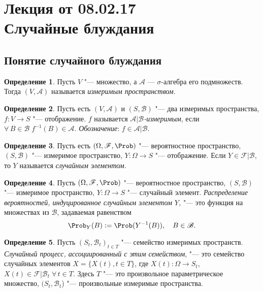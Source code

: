 \documentclass[a4paper]{article}
\theoremstyle{plain}
\theoremstyle{definition}
\newtheorem{defn}{Определение}[section]
\theoremstyle{remark}
\theoremstyle{nonumberplain}
\theoremstyle{nonumberplain}
\begin{document}
\tableofcontents

\section[Лекция от 08.02.17. Случайные блуждания]{Лекция от 08.02.17\\ {\large Случайные блуждания}}

\subsection{Понятие случайного блуждания}

\begin{defn}
  Пусть $V$ "--- множество, а $\mathscr{A}$ — $\sigma$-алгебра его подмножеств. Тогда $(V, \mathscr{A})$ называется \emph{измеримым пространством}.
\end{defn}

\begin{defn}
  Пусть есть $(V, \mathscr{A})$ и $(S, \mathscr{B})$ "--- два измеримых пространства, $f\colon V \to S$ "--- отображение. $f$ называется \emph{$\mathscr{A}|\mathscr{B}$-измеримым}, если $\forall\, B \in\mathscr{B}\; f^{-1}(B)\in\mathscr{A}$. \emph{Обозначение}: $f\in\mathscr{A}|\mathscr{B}$.
\end{defn}

\begin{defn}
  Пусть есть $(\Omega, \mathscr{F}, \Prob)$ "--- вероятностное пространство, $(S, \mathscr{B})$ "--- измеримое пространство, $Y\colon \Omega \to S$ "--- отображение. Если $Y\in\mathscr{F}|\mathscr{B}$, то $Y$ называется \emph{случайным элементом}.
\end{defn}

\begin{defn}
  Пусть $(\Omega, \mathscr{F}, \Prob)$ "--- вероятностное пространство, $(S, \mathscr{B})$ "--- измеримое пространство, $Y\colon \Omega \to S$ "--- случайный элемент. \emph{Распределение вероятностей, индуцированное случайным элементом $Y$,} "--- это функция на множествах из $\mathscr{B}$, задаваемая равенством
  \begin{equation*}
    \Prob_{Y}(B):= \Prob(Y^{-1}(B)), \quad B\in\mathscr{B}.
  \end{equation*}
\end{defn}

\begin{defn}
  Пусть $(S_{t}, \mathscr{B}_{t})_{t \in T}$ "--- семейство измеримых пространств. \emph{Случайный процесс, ассоциированный с этим семейством}, "--- это семейство случайных элементов $X = \lbrace X(t){,} t \in T \rbrace$, где $X(t)\colon \Omega \to S_{t}$, $X(t) \in \mathscr{F}|\mathscr{B}_{t} \;\forall\,t \in T$. Здесь $T$ "--- это произвольное параметрическое множество, $(S_{t}, \mathscr{B}_{t}$) "--- произвольные измеримые пространства.
\end{defn}
\end{document}
